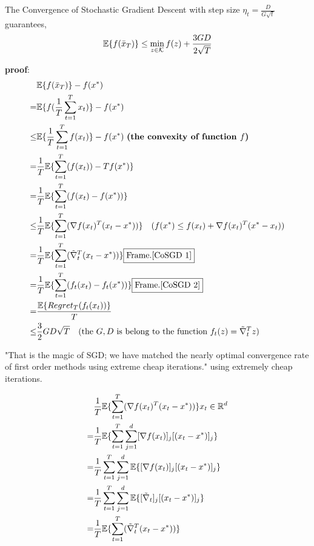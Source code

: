 			\begin{them}{The Convergence of Stochastic Gradient Descent}{}
				 with step size $\eta_t=\frac{D}{G\sqrt{t}}$ guarantees,
				$$
				\mathbb{E}\{f(\bar{x}_T)\} \le \min_{z\in\mathcal{K}}f(z) +\frac{3GD}{2\sqrt{T}}
				$$
				
				\textbf{proof}:
					\begin{equation*} 
						\begin{split}
							&\mathbb{E}\{f(\bar{x}_T)\} -f(x^*)  \\
							= &\mathbb{E}\{f(\frac{1}{T}\sum_{t=1}^Tx_t)\} -f(x^*) \\
							\le & \mathbb{E}\{\frac{1}{T}\sum_{t=1}^Tf(x_t)\} -f(x^*) \text{ \textbf{(the convexity of function $f$)}} \\
							=& \frac{1}{T}\mathbb{E}\{\sum_{t=1}^T(f(x_t)) -Tf(x^*) \} \\
							=& \frac{1}{T}\mathbb{E}\{\sum_{t=1}^T(f(x_t) -f(x^*)) \} \\
							\le & \frac{1}{T}\mathbb{E}\{\sum_{t=1}^T(\nabla f(x_t)^T(x_t-x^*)) \} \text{\quad($f(x^*)\le f(x_t)+\nabla f(x_t)^T(x^*-x_t)$)} \\
							=& \frac{1}{T}\mathbb{E}\{\sum_{t=1}^T(\tilde{\nabla}_t^T(x_t-x^*)) \} \fbox{Frame.\ref{CoSGD 1}}\\
							=& \frac{1}{T}\mathbb{E}\{\sum_{t=1}^T(f_t(x_t)-f_t(x^*)) \} \fbox{Frame.\ref{CoSGD 2}} \\
							=& \frac{\mathbb{E}\{Regret_T(f_t(x_t))\}}{T} \\
							\le&\frac{3}{2}GD\sqrt{T} \text{\quad (the $G,D$ is belong to the function $f_t(z) = \tilde{\nabla}_t^Tz$)}
						\end{split}
					\end{equation*}
			\end{them}
			"That is the magic of SGD; we have matched the nearly optimal convergence rate of first order methods using extreme cheap iterations." \cite{hazan2023introductiononlineconvexoptimization}
			using extremely cheap iterations. 
			\begin{framed} \label{CoSGD 1}
				\begin{equation} 
					\begin{split}
				    	&\frac{1}{T}\mathbb{E}\{\sum_{t=1}^T(\nabla f(x_t)^T(x_t-x^*)) \} \text{$x_t\in\mathbb{R}^d$}\\
				    	=& \frac{1}{T}\mathbb{E}\{\sum_{t=1}^T \sum_{j=1}^d [\nabla f(x_t)]_j[(x_t-x^*)]_j\}  \\
				    	=&\frac{1}{T}\sum_{t=1}^T \sum_{j=1}^d \mathbb{E}\{[\nabla f(x_t)]_j[(x_t-x^*)]_j\} \\
				    	=&\frac{1}{T}\sum_{t=1}^T \sum_{j=1}^d \mathbb{E}\{[\tilde{\nabla}_t]_j[(x_t-x^*)]_j\} \\
				    	=&\frac{1}{T}\mathbb{E}\{\sum_{t=1}^T(\tilde{\nabla}_t^T(x_t-x^*)) \} 
				    \end{split}
				\end{equation}
			\end{framed}
